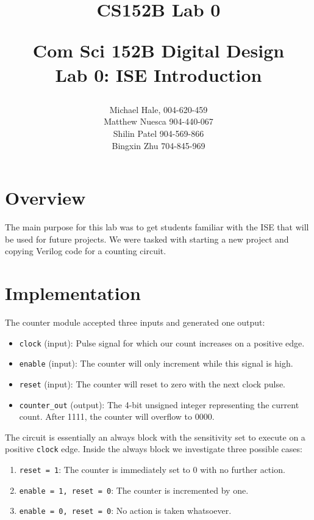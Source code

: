 \documentclass[11pt]{article}
\title{CS152B Lab 0}
\begin{document}
	
\title{\vspace{-0.5in} Com Sci 152B Digital Design \\
	Lab 0: ISE Introduction \\
	\author{Michael Hale, 004-620-459 \\ Matthew Nuesca 904-440-067 \\ Shilin Patel 904-569-866 \\ Bingxin Zhu 704-845-969}}
\date{}
\maketitle

\section*{Overview}
The main purpose for this lab was to get students familiar with the ISE that will be used for future projects. We were tasked with starting a new project and copying Verilog code for a counting circuit. 

\section*{Implementation}
The counter module accepted three inputs and generated one output:
\begin{itemize}
	\item \texttt{clock} (input): Pulse signal for which our count increases on a positive edge.
	
	\item \texttt{enable} (input): The counter will only increment while this signal is high.
	
	\item \texttt{reset} (input): The counter will reset to zero with the next clock pulse. 
	
	\item \texttt{counter\_out} (output): The 4-bit unsigned integer representing the current count. After 1111, the counter will overflow to 0000. 
\end{itemize}

The circuit is essentially an always block with the sensitivity set to execute on a positive \texttt{clock} edge. Inside the always block we investigate three possible cases:

\begin{enumerate}
	\item \texttt{reset = 1}: The counter is immediately set to 0 with no further action.
	\item \texttt{enable = 1, reset = 0}: The counter is incremented by one.
	\item \texttt{enable = 0, reset = 0}: No action is taken whatsoever.
\end{enumerate}
\end{document}
